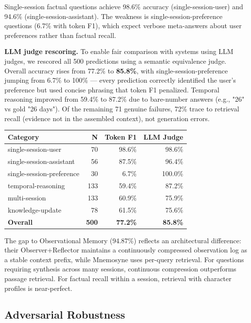 \documentclass[11pt]{article}
\begin{document}
Single-session factual questions achieve 98.6\% accuracy (single-session-user) and 94.6\% (single-session-assistant). The weakness is single-session-preference questions (6.7\% with token F1), which expect verbose meta-answers about user preferences rather than factual recall.

\textbf{LLM judge rescoring.} To enable fair comparison with systems using LLM judges, we rescored all 500 predictions using a semantic equivalence judge. Overall accuracy rises from 77.2\% to \textbf{85.8\%}, with single-session-preference jumping from 6.7\% to 100\% --- every prediction correctly identified the user's preference but used concise phrasing that token F1 penalized. Temporal reasoning improved from 59.4\% to 87.2\% due to bare-number answers (e.g., "26" vs gold "26 days"). Of the remaining 71 genuine failures, 72\% trace to retrieval recall (evidence not in the assembled context), not generation errors.


\begin{table}[htbp]
\centering
\small
\begin{tabular}{lrrr}
\toprule
\textbf{Category} & \textbf{N} & \textbf{Token F1} & \textbf{LLM Judge} \\
\midrule
single-session-user & 70 & 98.6\% & 98.6\% \\
single-session-assistant & 56 & 87.5\% & 96.4\% \\
single-session-preference & 30 & 6.7\% & 100.0\% \\
temporal-reasoning & 133 & 59.4\% & 87.2\% \\
multi-session & 133 & 60.9\% & 75.9\% \\
knowledge-update & 78 & 61.5\% & 75.6\% \\
\textbf{Overall} & \textbf{500} & \textbf{77.2\%} & \textbf{85.8\%} \\
\bottomrule
\end{tabular}
\end{table}

The gap to Observational Memory (94.87\%) reflects an architectural difference: their Observer+Reflector maintains a continuously compressed observation log as a stable context prefix, while Mnemosyne uses per-query retrieval. For questions requiring synthesis across many sessions, continuous compression outperforms passage retrieval. For factual recall within a session, retrieval with character profiles is near-perfect.


\subsection{Adversarial Robustness}
\end{document}
